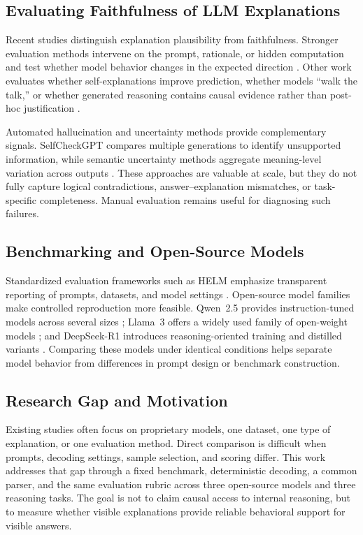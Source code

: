 \documentclass{article}
\begin{document}
\subsection{Evaluating Faithfulness of LLM Explanations}

Recent studies distinguish explanation plausibility from faithfulness. Stronger evaluation methods intervene on the prompt, rationale, or hidden computation and test whether model behavior changes in the expected direction \cite{turpin2023language,lanham2023measuring,zaman2025causal}. Other work evaluates whether self-explanations improve prediction, whether models ``walk the talk,'' or whether generated reasoning contains causal evidence rather than post-hoc justification \cite{madsen2024selfexplanations,paul2024making,matton2025walk}.

Automated hallucination and uncertainty methods provide complementary signals. SelfCheckGPT compares multiple generations to identify unsupported information, while semantic uncertainty methods aggregate meaning-level variation across outputs \cite{manakul2023selfcheckgpt,farquhar2024semantic}. These approaches are valuable at scale, but they do not fully capture logical contradictions, answer--explanation mismatches, or task-specific completeness. Manual evaluation remains useful for diagnosing such failures.

\subsection{Benchmarking and Open-Source Models}

Standardized evaluation frameworks such as HELM emphasize transparent reporting of prompts, datasets, and model settings \cite{liang2023helm}. Open-source model families make controlled reproduction more feasible. Qwen~2.5 provides instruction-tuned models across several sizes \cite{qwen2024qwen25}; Llama~3 offers a widely used family of open-weight models \cite{grattafiori2024llama3}; and DeepSeek-R1 introduces reasoning-oriented training and distilled variants \cite{deepseek2025r1}. Comparing these models under identical conditions helps separate model behavior from differences in prompt design or benchmark construction.

\subsection{Research Gap and Motivation}

Existing studies often focus on proprietary models, one dataset, one type of explanation, or one evaluation method. Direct comparison is difficult when prompts, decoding settings, sample selection, and scoring differ. This work addresses that gap through a fixed benchmark, deterministic decoding, a common parser, and the same evaluation rubric across three open-source models and three reasoning tasks. The goal is not to claim causal access to internal reasoning, but to measure whether visible explanations provide reliable behavioral support for visible answers.
\end{document}
